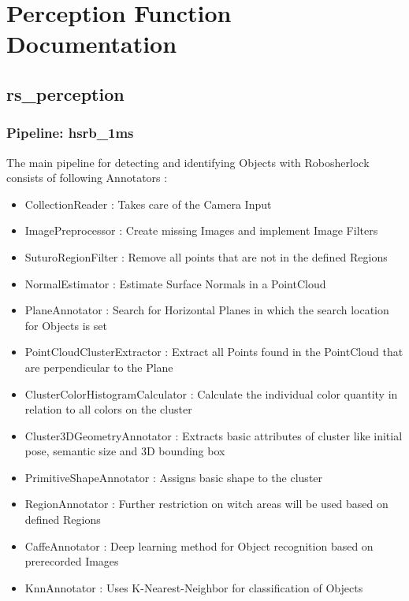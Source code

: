 \documentclass[main.tex]{subfiles}
\begin{document}
\begingroup

\renewcommand{\cleardoublepage}{}

\renewcommand{\clearpage}{}

\chapter{Perception Function Documentation}

		\section{rs\_perception}

			\subsection{Pipeline: hsrb\_1ms}

The main pipeline for detecting and identifying Objects with Robosherlock consists of following Annotators :  
\begin{itemize}
	\item CollectionReader : Takes care of the Camera  Input
	\item ImagePreprocessor : Create missing Images and implement Image Filters  
	\item SuturoRegionFilter : Remove all points that are not in the defined Regions 
	\item NormalEstimator : Estimate Surface Normals in a PointCloud 
	\item PlaneAnnotator : Search for Horizontal Planes in which the search location for Objects is set
	\item PointCloudClusterExtractor : Extract all Points found in the PointCloud that are perpendicular to the Plane 
	\item ClusterColorHistogramCalculator : Calculate the individual color quantity in relation to all colors on the cluster   
	\item Cluster3DGeometryAnnotator : Extracts basic attributes of cluster like initial pose, semantic size and 3D bounding box 
	\item PrimitiveShapeAnnotator : Assigns basic shape to the cluster
	\item RegionAnnotator : Further restriction on witch areas will be used based on defined Regions 
	\item CaffeAnnotator : Deep learning method for Object recognition based on prerecorded Images 
	\item KnnAnnotator : Uses K-Nearest-Neighbor for classification of Objects 
\end{itemize}
\end{document}
